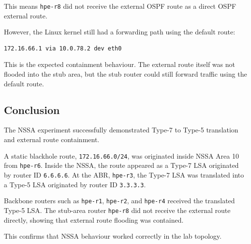 This means \texttt{hpe-r8} did not receive the external OSPF route as a direct OSPF external route.

However, the Linux kernel still had a forwarding path using the default route:

\begin{verbatim}
172.16.66.1 via 10.0.78.2 dev eth0
\end{verbatim}

This is the expected containment behaviour. The external route itself was not flooded into the stub area, but the stub router could still forward traffic using the default route.

\subsection{Conclusion}

The NSSA experiment successfully demonstrated Type-7 to Type-5 translation and external route containment.

A static blackhole route, \texttt{172.16.66.0/24}, was originated inside NSSA Area 10 from \texttt{hpe-r6}. Inside the NSSA, the route appeared as a Type-7 LSA originated by router ID \texttt{6.6.6.6}. At the ABR, \texttt{hpe-r3}, the Type-7 LSA was translated into a Type-5 LSA originated by router ID \texttt{3.3.3.3}.

Backbone routers such as \texttt{hpe-r1}, \texttt{hpe-r2}, and \texttt{hpe-r4} received the translated Type-5 LSA. The stub-area router \texttt{hpe-r8} did not receive the external route directly, showing that external route flooding was contained.

This confirms that NSSA behaviour worked correctly in the lab topology.
